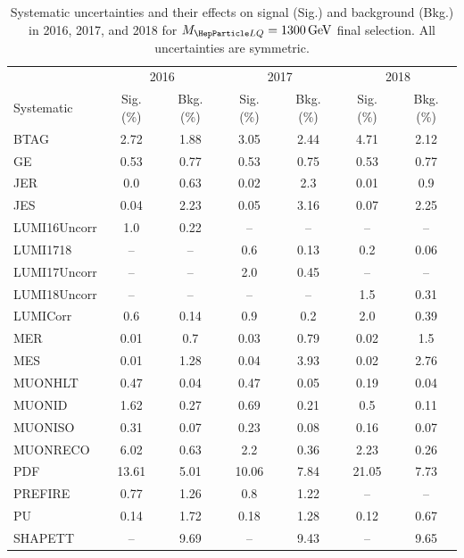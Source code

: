 \begin{table}[H]
	\begin{center}
        \begin{footnotesize}
			\caption{Systematic uncertainties and their effects on signal (Sig.) and background (Bkg.) in 2016, 2017, and 2018 for $\MLQ = \SI{1300}{GeV}$ final selection. All uncertainties are symmetric.}
			\begin{tabular}{lcccccc} \hline \hline
				& \multicolumn{2}{c}{2016} & \multicolumn{2}{c}{2017} & \multicolumn{2}{c}{2018} \\
				Systematic & Sig. (\%) & Bkg. (\%) & Sig. (\%) & Bkg. (\%) & Sig. (\%) & Bkg. (\%) \\ \hline
				BTAG &  2.72  &  1.88 &  3.05  &  2.44 &  4.71  &  2.12 \\
				GE &  0.53  &  0.77 &  0.53  &  0.75 &  0.53  &  0.77 \\
				JER &  0.0  &  0.63 &  0.02  &  2.3 &  0.01  &  0.9 \\
				JES &  0.04  &  2.23 &  0.05  &  3.16 &  0.07  &  2.25 \\
				LUMI16Uncorr &  1.0  &  0.22 & -- & -- & -- & -- \\
				LUMI1718 & -- & -- &  0.6  &  0.13 &  0.2  &  0.06 \\
				LUMI17Uncorr & -- & -- &  2.0  &  0.45 & -- & -- \\
				LUMI18Uncorr & -- & -- & -- & -- &  1.5  &  0.31 \\
				LUMICorr &  0.6  &  0.14 &  0.9  &  0.2 &  2.0  &  0.39 \\
				MER &  0.01  &  0.7 &  0.03  &  0.79 &  0.02  &  1.5 \\
				MES &  0.01  &  1.28 &  0.04  &  3.93 &  0.02  &  2.76 \\
				MUONHLT &  0.47  &  0.04 &  0.47  &  0.05 &  0.19  &  0.04 \\
				MUONID &  1.62  &  0.27 &  0.69  &  0.21 &  0.5  &  0.11 \\
				MUONISO &  0.31  &  0.07 &  0.23  &  0.08 &  0.16  &  0.07 \\
				MUONRECO &  6.02  &  0.63 &  2.2  &  0.36 &  2.23  &  0.26 \\
				PDF &  13.61  &  5.01 &  10.06  &  7.84 &  21.05  &  7.73 \\
				PREFIRE &  0.77  &  1.26 &  0.8  &  1.22 & -- & -- \\
				PU &  0.14  &  1.72 &  0.18  &  1.28 &  0.12  &  0.67 \\
				SHAPETT & -- &  9.69 & -- &  9.43 & -- &  9.65 \\

\end{tabular}
\end{footnotesize}
\end{center}
\end{table}
